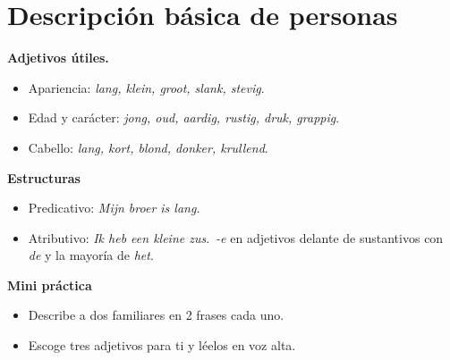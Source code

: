 \section{Descripción básica de personas}
\textbf{Adjetivos útiles.}
\begin{itemize}[leftmargin=*]
  \item Apariencia: \textit{lang, klein, groot, slank, stevig}.
  \item Edad y carácter: \textit{jong, oud, aardig, rustig, druk, grappig}.
  \item Cabello: \textit{lang, kort, blond, donker, krullend}.
\end{itemize}

\textbf{Estructuras}
\begin{itemize}[leftmargin=*]
  \item Predicativo: \textit{Mijn broer is lang}.
  \item Atributivo: \textit{Ik heb een kleine zus}.\ \textit{-e} en adjetivos delante de sustantivos con \textit{de} y la mayoría de \textit{het}.
\end{itemize}

\textbf{Mini práctica}
\begin{itemize}[leftmargin=*]
  \item Describe a dos familiares en 2 frases cada uno.
  \item Escoge tres adjetivos para ti y léelos en voz alta.
\end{itemize}
